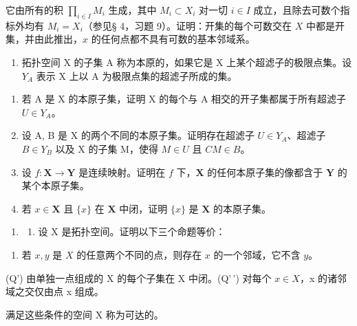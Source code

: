 它由所有的积 \(\prod_{i\in I}M_i\) 生成，其中 \(M_i\subset X_i\) 对一切 \(i\in I\) 成立，且除去可数个指标外均有 \(M_i = X_i\)（参见§ 4，习题 9）。证明：开集的每个可数交在 \(X\) 中都是开集，并由此推出，\(x\) 的任何点都不具有可数的基本邻域系。

\begin{enumerate}
\def\labelenumi{\arabic{enumi})}
\setcounter{enumi}{6}
\tightlist
\item
  拓扑空间 X 的子集 A 称为本原的，如果它是 X 上某个超滤子的极限点集。设 \(Y_{A}\) 表示 X 上以 A 为极限点集的超滤子所成的集。
\end{enumerate}

\begin{enumerate}
\def\labelenumi{\alph{enumi})}
\item
  若 A 是 X 的本原子集，证明 X 的每个与 A 相交的开子集都属于所有超滤子 \(U \in Y_{A}\)。
\item
  设 A, B 是 X 的两个不同的本原子集。证明存在超滤子 \(U \in Y_{A}\)、超滤子 \(B \in Y_{B}\) 以及 X 的子集 M，使得 \(M \in U\) 且 \(CM \in B\)。
\item
  设 \(f: \mathbf{X} \to \mathbf{Y}\) 是连续映射。证明在 \(f\) 下，\(\mathbf{X}\) 的任何本原子集的像都含于 \(\mathbf{Y}\) 的某个本原子集。
\item
  若 \(x \in \mathbf{X}\) 且 \(\{x\}\) 在 \(\mathbf{X}\) 中闭，证明 \(\{x\}\) 是 \(\mathbf{X}\) 的本原子集。
\end{enumerate}

\BourbakiExerciseGroup

\begin{enumerate}
\def\labelenumi{\arabic{enumi})}
\tightlist
\item
  \begin{enumerate}
  \def\labelenumii{\alph{enumii})}
  \tightlist
  \item
    设 X 是拓扑空间。证明以下三个命题等价：
  \end{enumerate}
\end{enumerate}

\begin{enumerate}
\def\labelenumi{(\Alph{enumi})}
\setcounter{enumi}{16}
\tightlist
\item
  若 \(x, y\) 是 \(X\) 的任意两个不同的点，则存在 \(x\) 的一个邻域，它不含 \(y\)。
\end{enumerate}

(Q') 由单独一点组成的 X 的每个子集在 X 中闭。(Q'\,') 对每个 \(x \in X\)，x 的诸邻域之交仅由点 x 组成。

满足这些条件的空间 X 称为可达的。

